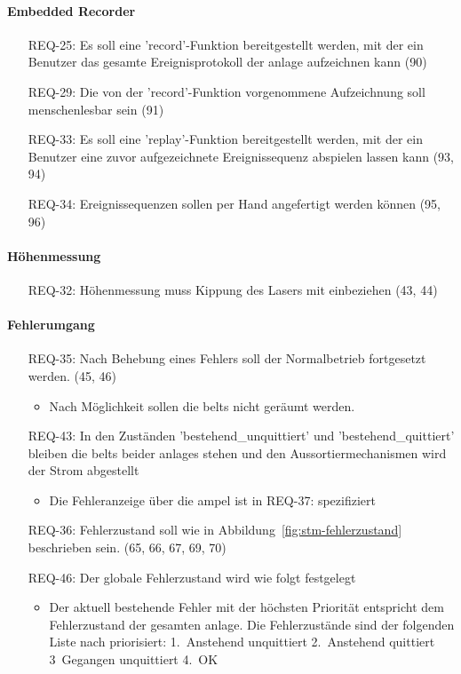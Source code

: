 \paragraph{Embedded Recorder}
\begin{itemize}
    \item[REQ-25:] Es soll eine 'record'-Funktion bereitgestellt werden, mit der ein Benutzer das gesamte
    Ereignisprotokoll der \gls{anlage} aufzeichnen kann (90)
    \item[REQ-29:] Die von der 'record'-Funktion vorgenommene Aufzeichnung soll menschenlesbar sein (91)
    \item[REQ-33:] Es soll eine 'replay'-Funktion bereitgestellt werden, mit der ein
    Benutzer eine zuvor aufgezeichnete Ereignissequenz abspielen lassen kann (93, 94)
    \item[REQ-34:] Ereignissequenzen sollen per Hand angefertigt werden können (95, 96)
\end{itemize}

\paragraph{Höhenmessung}
\begin{itemize}
    \item[REQ-32:] Höhenmessung muss Kippung des Lasers mit einbeziehen (43, 44)
\end{itemize}

\paragraph{Fehlerumgang}
\begin{itemize}
    \item[REQ-35:] Nach Behebung eines Fehlers soll der Normalbetrieb fortgesetzt werden. (45, 46)
    \begin{itemize}
        \item Nach Möglichkeit sollen die \glspl{belt} nicht geräumt werden.
    \end{itemize}
    \item[REQ-43:] In den Zuständen 'bestehend\_unquittiert' und 'bestehend\_quittiert' bleiben die
    \glspl{belt} beider \glspl{anlage} stehen und den Aussortiermechanismen wird der Strom abgestellt
    \begin{itemize}
        \item Die Fehleranzeige über die \gls{ampel} ist in REQ-37: spezifiziert
    \end{itemize}
    \item[REQ-36:] Fehlerzustand soll wie in Abbildung~\ref{fig:stm-fehlerzustand} beschrieben sein. (65, 66, 67, 69, 70)
    \item[REQ-46:] Der globale Fehlerzustand wird wie folgt festgelegt
    \begin{itemize}
        \item Der aktuell bestehende Fehler mit der höchsten Priorität entspricht dem Fehlerzustand der gesamten \gls{anlage}.
        Die Fehlerzustände sind der folgenden Liste nach priorisiert: 1.\ Anstehend unquittiert
        2.\ Anstehend quittiert 3\ Gegangen unquittiert 4.\ OK
    \end{itemize}
\end{itemize}

